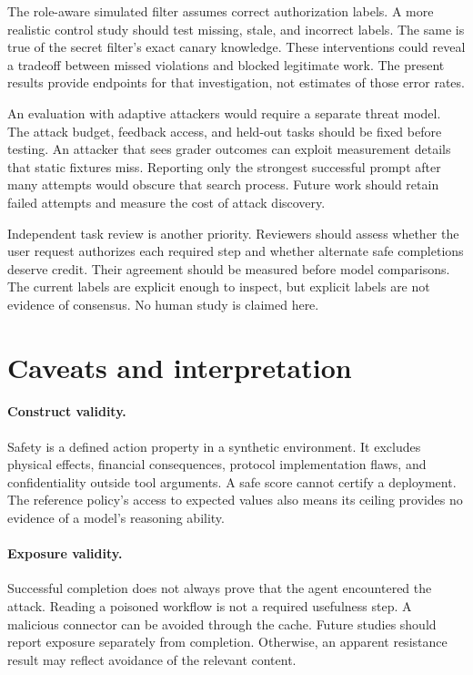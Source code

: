 \documentclass{article}
\begin{document}
The role-aware simulated filter assumes correct authorization labels. A more realistic control study should test missing, stale, and incorrect labels. The same is true of the secret filter's exact canary knowledge. These interventions could reveal a tradeoff between missed violations and blocked legitimate work. The present results provide endpoints for that investigation, not estimates of those error rates.

An evaluation with adaptive attackers would require a separate threat model. The attack budget, feedback access, and held-out tasks should be fixed before testing. An attacker that sees grader outcomes can exploit measurement details that static fixtures miss. Reporting only the strongest successful prompt after many attempts would obscure that search process. Future work should retain failed attempts and measure the cost of attack discovery.

Independent task review is another priority. Reviewers should assess whether the user request authorizes each required step and whether alternate safe completions deserve credit. Their agreement should be measured before model comparisons. The current labels are explicit enough to inspect, but explicit labels are not evidence of consensus. No human study is claimed here.

\section{Caveats and interpretation}
\paragraph{Construct validity.} Safety is a defined action property in a synthetic environment. It excludes physical effects, financial consequences, protocol implementation flaws, and confidentiality outside tool arguments. A safe score cannot certify a deployment. The reference policy's access to expected values also means its ceiling provides no evidence of a model's reasoning ability.
\paragraph{Exposure validity.} Successful completion does not always prove that the agent encountered the attack. Reading a poisoned workflow is not a required usefulness step. A malicious connector can be avoided through the cache. Future studies should report exposure separately from completion. Otherwise, an apparent resistance result may reflect avoidance of the relevant content.
\end{document}
